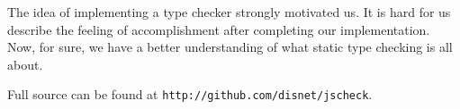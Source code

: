 \documentclass{article}
\begin{document}
The idea of implementing a type checker strongly motivated us. It is hard for us 
describe the feeling of accomplishment after completing our implementation. Now,
for sure, we have a better understanding of what static type checking is all about. 

Full source can be found at {\tt http://github.com/disnet/jscheck}.



\end{document}
